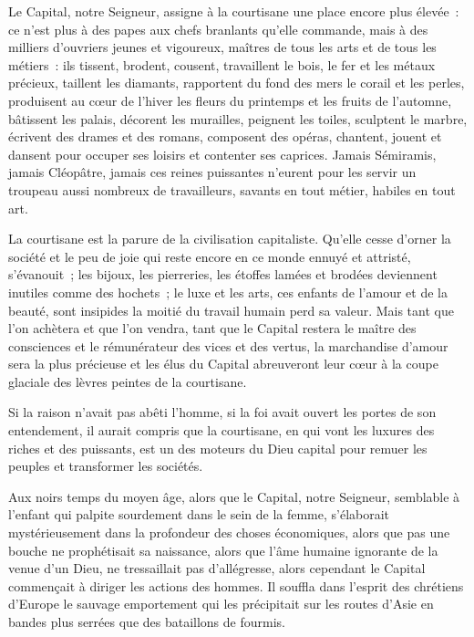 \documentclass[french,twoside]{book} %
\begin{document}
Le Capital, notre Seigneur, assigne à la courtisane une place encore plus élevée : ce n’est plus à des papes aux chefs branlants qu’elle commande, mais à des milliers d’ouvriers jeunes et vigoureux, maîtres de tous les arts et de tous les métiers : ils tissent, brodent, cousent, travaillent le bois, le fer et les métaux précieux, taillent les diamants, rapportent du fond des mers le corail et les perles, produisent au cœur de l’hiver les fleurs du printemps et les fruits de l’automne, bâtissent les palais, décorent les murailles, peignent les toiles, sculptent le marbre, écrivent des drames et des romans, composent des opéras, chantent, jouent et dansent pour occuper ses loisirs et contenter ses caprices. Jamais Sémiramis, jamais Cléopâtre, jamais ces reines puissantes n’eurent pour les servir un troupeau aussi nombreux de travailleurs, savants en tout métier, habiles en tout art.\par
La courtisane est la parure de la civilisation capitaliste. Qu'elle cesse d’orner la société et le peu de joie qui reste encore en ce monde ennuyé et attristé, s’évanouit ; les bijoux, les pierreries, les étoffes lamées et brodées deviennent inutiles comme des hochets ; le luxe et les arts, ces enfants de l’amour et de la beauté, sont insipides la moitié du travail humain perd sa valeur. Mais tant que l’on achètera et que l’on vendra, tant que le Capital restera le maître des consciences et le rémunérateur des vices et des vertus, la marchandise d’amour sera la plus précieuse et les élus du Capital abreuveront leur cœur à la coupe glaciale des lèvres peintes de la courtisane.\par
Si la raison n’avait pas abêti l’homme, si la foi avait ouvert les portes de son entendement, il aurait compris que la courtisane, en qui vont les luxures des riches et des puissants, est un des moteurs du Dieu capital pour remuer les peuples et transformer les sociétés.\par
Aux noirs temps du moyen âge, alors que le Capital, notre Seigneur, semblable à l’enfant qui palpite sourdement dans le sein de la femme, s’élaborait mystérieusement dans la profondeur des choses économiques, alors que pas une bouche ne prophétisait sa naissance, alors que l’âme humaine ignorante de la venue d’un Dieu, ne tressaillait pas d’allégresse, alors cependant le Capital commençait à diriger les actions des hommes. Il souffla dans l’esprit des chrétiens d’Europe le sauvage emportement qui les précipitait sur les routes d’Asie en bandes plus serrées que des bataillons de fourmis.\par
\end{document}
